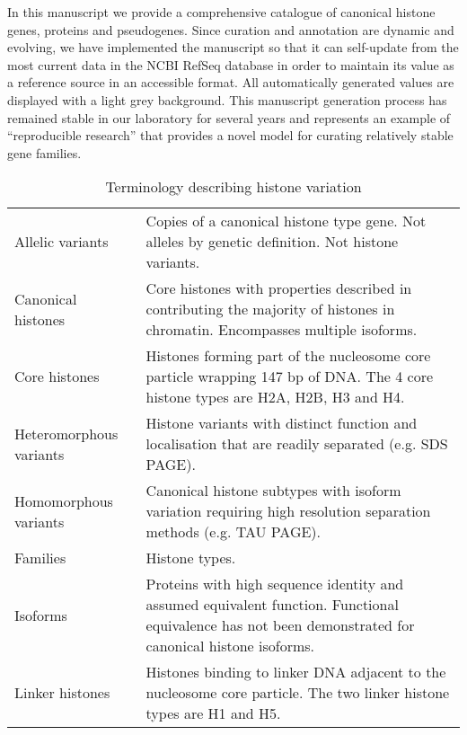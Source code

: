 	In this manuscript we provide a comprehensive catalogue
	of canonical histone genes, proteins and pseudogenes.
	Since curation and annotation are dynamic and evolving,
	we have implemented the manuscript so that it can 
	self-update from the most current data in the NCBI RefSeq database 
	in order to maintain its value as a reference source in an accessible format.
	All automatically generated values are displayed with a light grey background.
	This manuscript generation process has remained stable in our laboratory for several years
	and represents an example of ``reproducible research'' \citep{Claerbout2000}
	that provides a novel model for curating relatively stable gene families.

  \begin{table*}[hp]
    \caption{Terminology describing histone variation}
    \label{tab:histone-divisions}
    \centering
    \begin{tabular}{F p{\dimexpr(\textwidth--4\tabcolsep)}}
      \toprule
	  Allelic variants &
	  Copies of a canonical histone type gene. Not alleles by genetic definition. Not histone variants. 
	  \\
      \addlinespace
	  Canonical histones &
	  Core histones with properties described in  
	  contributing the majority of histones in chromatin.
	  Encompasses multiple isoforms.
	  \\
      \addlinespace
	  Core histones &
	  Histones forming part of the nucleosome core particle wrapping 147 bp of DNA.
	  The 4 core histone types are H2A, H2B, H3 and H4.
	  \\
      \addlinespace
	  Heteromorphous variants &
	  Histone variants with distinct function and localisation that are readily separated (e.g. SDS PAGE).
	  \\
      \addlinespace
	  Homomorphous variants &
	  Canonical histone subtypes with isoform variation 
	  requiring high resolution separation methods (e.g. TAU PAGE).
	  \\
      \addlinespace
	  Families &
	  Histone types.
	  \\
      \addlinespace
	  Isoforms &
	  Proteins with high sequence identity and assumed equivalent function. 
	  Functional equivalence has not been demonstrated for canonical histone isoforms.
	  \\
      \addlinespace
	  Linker histones &
	  Histones binding to linker DNA adjacent to the nucleosome core particle.
	  The two linker histone types are H1 and H5.

\end{tabular}
\end{table*}

